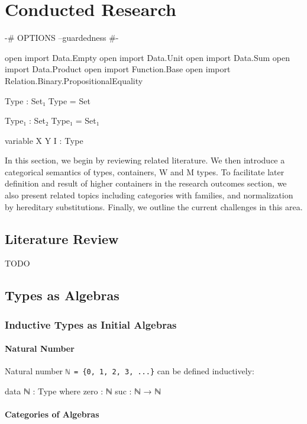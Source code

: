 \chapter{Conducted Research}

\begin{code}[hide]
{-# OPTIONS --guardedness #-}

open import Data.Empty
open import Data.Unit
open import Data.Sum
open import Data.Product
open import Function.Base
open import Relation.Binary.PropositionalEquality

Type : Set₁
Type = Set

Type₁ : Set₂
Type₁ = Set₁

variable X Y I : Type
\end{code}

In this section, we begin by reviewing related literature. We then introduce a categorical semantics of types, containers, W and M types. To facilitate later definition and result of higher containers in the research outcomes section, we also present related topics including categories with families, and normalization by hereditary substitutions. Finally, we outline the current challenges in this area.

\section{Literature Review}
TODO

\section{Types as Algebras}

\subsection{Inductive Types as Initial Algebras}

\subsubsection*{Natural Number}

Natural number \texttt{ℕ = \{0, 1, 2, 3, ...\}} can be defined inductively:

\begin{code}
data ℕ : Type where
  zero : ℕ
  suc : ℕ → ℕ
\end{code}

\subsubsection*{Categories of Algebras}

